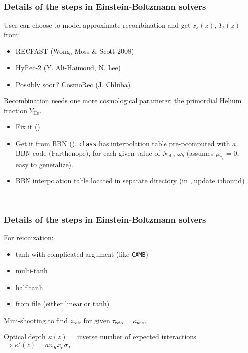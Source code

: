 \begin{frame}[fragile]
\frametitle{Details of the steps in Einstein-Boltzmann solvers}

User can choose to model approximate recombination and get $x_e(z)$, $T_b(z)$ from:
\begin{itemize}
\item {\Green RECFAST} (Wong, Moss \& Scott 2008)
\item {\Green HyRec-2} (Y. Ali-Ha\"{\i}moud, N. Lee)
\item Possibly soon? {\Green CosmoRec} (J. Chluba)
\end{itemize}

\pause
\vspace{0.2cm}

Recombination needs one more cosmological parameter: the {\Red primordial Helium fraction} $Y_\mathrm{He}$.
\begin{itemize}
\item Fix it ()
\item Get it from BBN (). {\tt \Red class} has interpolation table pre-pcomputed with a {\Red BBN code} ({\Green Parthenope}), for each given value of $N_\mathrm{eff}$, $\omega_b$ (assumes $\mu_{\nu_e}=0$, easy to generalize).
\item BBN interpolation table located in separate directory (in , update inbound)
\end{itemize}


\mbox{}\\

\end{frame}


\begin{frame}[fragile]
	\frametitle{Details of the steps in Einstein-Boltzmann solvers}
	
	For reionization:
	\begin{itemize}
		\item tanh with complicated argument (like {\tt \Red CAMB})
		\item multi-tanh
		\item half tanh
		\item from file (either linear or tanh)
	\end{itemize}
	
	\pause 
	\vspace{0.2cm}
	Mini-shooting to find $z_\mathrm{reio}$ for given $\tau_\mathrm{reio} = \kappa_\mathrm{reio}$. 
	
	Optical depth $\kappa(z)$ = inverse number of expected interactions  $\Rightarrow \kappa'(z) = a n_H x_e \sigma_T$\\
\end{frame}


